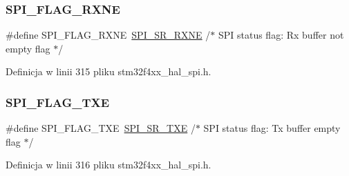 \subsubsection{\texorpdfstring{S\+P\+I\+\_\+\+F\+L\+A\+G\+\_\+\+R\+X\+NE}{SPI\_FLAG\_RXNE}}
{\footnotesize\ttfamily \#define S\+P\+I\+\_\+\+F\+L\+A\+G\+\_\+\+R\+X\+NE~\hyperlink{group___peripheral___registers___bits___definition_ga40e14de547aa06864abcd4b0422d8b48}{S\+P\+I\+\_\+\+S\+R\+\_\+\+R\+X\+NE}   /$\ast$ S\+PI status flag\+: Rx buffer not empty flag       $\ast$/}



Definicja w linii 315 pliku stm32f4xx\+\_\+hal\+\_\+spi.\+h.

\mbox{\label{group___s_p_i___flags__definition_gaf84a1e6af2739a6be58e1b23d9e6b914}} 
\subsubsection{\texorpdfstring{S\+P\+I\+\_\+\+F\+L\+A\+G\+\_\+\+T\+XE}{SPI\_FLAG\_TXE}}
{\footnotesize\ttfamily \#define S\+P\+I\+\_\+\+F\+L\+A\+G\+\_\+\+T\+XE~\hyperlink{group___peripheral___registers___bits___definition_ga5bd5d21816947fcb25ccae7d3bf8eb2c}{S\+P\+I\+\_\+\+S\+R\+\_\+\+T\+XE}    /$\ast$ S\+PI status flag\+: Tx buffer empty flag           $\ast$/}



Definicja w linii 316 pliku stm32f4xx\+\_\+hal\+\_\+spi.\+h.

